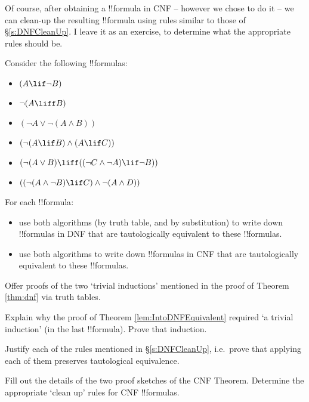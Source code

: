 \documentclass[../../../include/open-logic-section]{subfiles}
\begin{document}
Of course, after obtaining a !!{formula} in CNF -- however we chose to do it -- we can clean-up the resulting !!{formula} using rules similar to those of \S\ref{s:DNFCleanUp}. I leave it as an exercise, to determine what the appropriate rules should be.

\begin{prob}
\label{pr.DNF}
Consider the following !!{formula}s:
	\begin{itemize}
		\item $(A \lif \lnot B)$
		\item $\lnot (A \liff B)$
		\item $(\lnot A \lor \lnot (A \land B))$
		\item $(\lnot (A \lif B ) \land (A \lif C))$
		\item $(\lnot (A \lor B) \liff ((\lnot C \land \lnot A) \lif \lnot B))$
		\item $((\lnot (A \land \lnot B) \lif C) \land \lnot (A \land D))$
	\end{itemize}
For each !!{formula}:
	\begin{itemize}
		\item use both algorithms (by truth table, and by substitution) to write down !!{formula}s in DNF that are tautologically equivalent to these !!{formula}s.
		\item use both algorithms to write down !!{formula}s in CNF that are tautologically equivalent to these !!{formula}s. 
	\end{itemize}
\end{prob}

\begin{prob}
Offer proofs of the two `trivial inductions' mentioned in the proof of Theorem \ref{thm:dnf} via truth tables.\\
\end{prob}

\begin{prob}
Explain why the proof of Theorem \ref{lem:IntoDNFEquivalent} required `a trivial induction' (in the last !!{formula}). Prove that induction.\\
\end{prob}

\begin{prob}
Justify each of the rules mentioned in \S\ref{s:DNFCleanUp}, i.e.\ prove that applying each of them preserves tautological equivalence.\\
\end{prob}

\begin{prob}
Fill out the details of the two proof sketches of the CNF Theorem. Determine the appropriate `clean up' rules for CNF !!{formula}s.
\end{prob}
\end{document}

